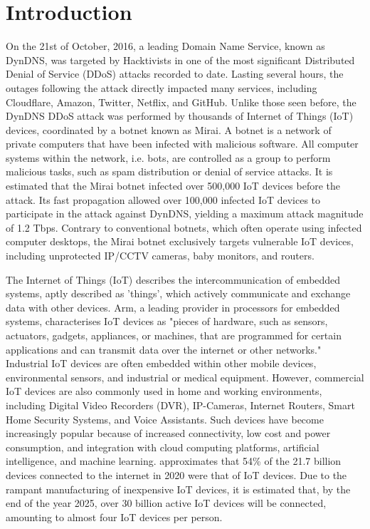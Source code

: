 
\chapter{Introduction}


On the 21st of October, 2016, a leading Domain Name Service, known as DynDNS, was targeted by Hacktivists in one of the most significant Distributed Denial of Service (DDoS) attacks recorded to date. Lasting several hours, the outages following the attack directly impacted many services, including Cloudflare, Amazon, Twitter, Netflix, and GitHub. \citep{Maunder2016} Unlike those seen before, the DynDNS DDoS attack was performed by thousands of Internet of Things (IoT) devices, coordinated by a botnet known as Mirai. A botnet is a network of private computers that have been infected with malicious software. All computer systems within the network, i.e. bots, are controlled as a group to perform malicious tasks, such as spam distribution or denial of service attacks. \citep{Lexico2021} It is estimated that the Mirai botnet infected over 500,000 IoT devices before the attack. Its fast propagation allowed over 100,000 infected IoT devices to participate in the attack against DynDNS, yielding a maximum attack magnitude of 1.2 Tbps. \citep{Threatpost2016} Contrary to conventional botnets, which often operate using infected computer desktops, the Mirai botnet exclusively targets vulnerable IoT devices, including unprotected IP/CCTV cameras, baby monitors, and routers.

The Internet of Things (IoT) describes the intercommunication of embedded systems, aptly described as 'things', which actively communicate and exchange data with other devices. \citep{Oracle2021} Arm, a leading provider in processors for embedded systems, characterises IoT devices as "pieces of hardware, such as sensors, actuators, gadgets, appliances, or machines, that are programmed for certain applications and can transmit data over the internet or other networks." \citep{Arm2021} Industrial IoT devices are often embedded within other mobile devices, environmental sensors, and industrial or medical equipment. However, commercial IoT devices are also commonly used in home and working environments, including Digital Video Recorders (DVR), IP-Cameras, Internet Routers, Smart Home Security Systems, and Voice Assistants. Such devices have become increasingly popular because of increased connectivity, low cost and power consumption, and integration with cloud computing platforms, artificial intelligence, and machine learning. \citep{Oracle2021} \citet{Lueth2020} approximates that 54\% of the 21.7 billion devices connected to the internet in 2020 were that of IoT devices. Due to the rampant manufacturing of inexpensive IoT devices, it is estimated that, by the end of the year 2025, over 30 billion active IoT devices will be connected, amounting to almost four IoT devices per person.

